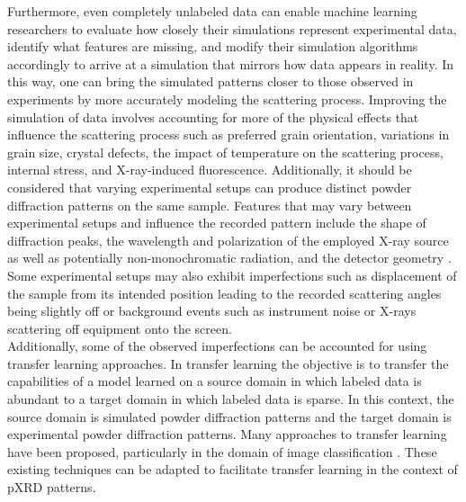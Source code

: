 Furthermore, even completely unlabeled data can enable machine learning researchers to evaluate how closely their simulations represent experimental data, identify what features are missing, and modify their simulation algorithms accordingly to arrive at a simulation that mirrors how data appears in reality. In this way, one can bring the simulated patterns closer to those observed in experiments by more accurately modeling the scattering process.
Improving the simulation of data involves accounting for more of the physical effects that influence the scattering process such as preferred grain orientation, variations in grain size, crystal defects, the impact of temperature on the scattering process, internal stress, and X-ray-induced fluorescence\cite{cao2024simxrd, Waseda2011, Pecharsky2023}.  Additionally, it should be considered that varying experimental setups can produce distinct powder diffraction patterns on the same sample. Features that may vary between experimental setups and influence the recorded pattern include the shape of diffraction peaks, the wavelength and polarization of the employed X-ray source as well as potentially non-monochromatic radiation, and the detector geometry
\cite{cao2024simxrd, Waseda2011, Pecharsky2023}. Some experimental setups may also exhibit imperfections such as displacement of the sample from its intended position leading to the recorded scattering angles being slightly off \cite{cao2024simxrd,hulbert2023} or background events such as instrument noise or X-rays scattering off equipment onto the screen.\\

Additionally, some of the observed imperfections can be accounted for using transfer learning approaches. In transfer learning the objective is to transfer the capabilities of a model learned on a source domain in which labeled data is abundant to a target domain in which labeled data is sparse\cite{Zhuang2021}. In this context, the source domain is simulated powder diffraction patterns and the target domain is experimental powder diffraction patterns. Many approaches to transfer learning have been proposed, particularly in the domain of image classification \cite{Gatys2016, Ganin2015}. These existing techniques can be adapted to facilitate transfer learning in the context of pXRD patterns.\\

